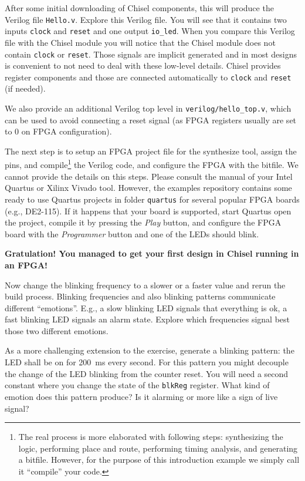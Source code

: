 \documentclass[a4paper]{article}
\newcommand{\code}[1]{{\small{\texttt{#1}}}}
\begin{document}
After some initial downloading of Chisel components, this will produce the Verilog file \code{Hello.v}.
Explore this Verilog file. You will see that it contains two inputs \code{clock} and \code{reset}
and one output \code{io\_led}. When you compare this Verilog file with the Chisel module
you will notice that the Chisel module does not contain \code{clock} or \code{reset}.
Those signals are implicit generated and in most designs is convenient to not need to
deal with these low-level details. Chisel provides register components and those
are connected automatically to \code{clock} and \code{reset} (if needed).


We also provide an additional Verilog top level in \code{verilog/hello\_top.v},
which can be used to avoid connecting a reset signal (as FPGA registers usually
are set to 0 on FPGA configuration).

The next step is to setup an FPGA project file for the synthesize tool, assign the pins,
and compile\footnote{The real process is more elaborated with following steps: synthesizing the logic,
performing place and route, performing timing analysis, and generating a bitfile.
However, for the purpose of this introduction example we simply call it ``compile''
your code.} the Verilog code, and configure the FPGA with the bitfile.
We cannot provide the details on this steps. Please consult the manual of
your Intel Quartus or Xilinx Vivado tool.
However, the examples repository contains some ready to use Quartus
projects in folder \code{quartus} for several popular FPGA boards (e.g., DE2-115).
If it happens that your board is supported, start Quartus open the project,
compile it by pressing the \emph{Play} button, and configure the FPGA board
with the \emph{Programmer} button and one of the LEDs should blink.

{\bf Gratulation! You managed to get your first design in Chisel running in an FPGA!}

Now change the blinking frequency to a slower or a faster value and
rerun the build process. Blinking frequencies and also blinking patterns
communicate different ``emotions''. E.g., a slow blinking LED signals that
everything is ok, a fast blinking LED signals an alarm state.
Explore which frequencies signal best those two different emotions.

As a more challenging extension to the exercise, generate a blinking pattern:
the LED shall be on for 200~ms every second. For this pattern you might
decouple the change of the LED blinking from the counter reset.
You will need a second constant where you change the state of the
\code{blkReg} register. What kind of emotion does this pattern produce?
Is it alarming or more like a sign of live signal?
\end{document}
